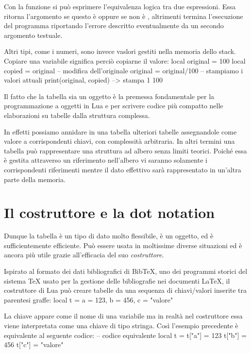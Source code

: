 Con la funzione  si può esprimere l'equivalenza logica tra due
espressioni. Essa ritorna l'argomento se questo è  oppure se non è
, altrimenti termina l'esecuzione del programma riportando l'errore
descritto eventualmente da un secondo argomento testuale.

Altri tipi, come i numeri, sono invece vaslori gestiti nella memoria dello
stack. Copiare una variabile significa perciò copiarne il valore:
\lines
local original = 100
local copied = original
-- modifica dell'originale
original = original/100
-- stampiamo i valori attuali
print(original, copied) --> stampa 1  100
\endlines
{}

Il fatto che la tabella sia un oggetto è la premessa fondamentale per la
programmazione a oggetti in Lua e per scrivere codice più compatto nelle
elaborazioni su tabelle dalla struttura complessa.

In effetti possiamo annidare in una tabella ulteriori tabelle assegnandole come
valore a corrispondenti chiavi, con complessità arbitraria. In altri termini una
tabella può rappresentare una struttura ad albero senza limiti teorici. Poiché
essa è gestita attraverso un riferimento nell'albero vi saranno solamente i
corrispondenti riferimenti mentre il dato effettivo sarà rappresentato in
un'altra parte della memoria.


\section{Il costruttore e la dot notation}

Dunque la tabella è un tipo di dato molto flessibile, è un oggetto, ed è
sufficientemente efficiente. Può essere usata in moltissime diverse situazioni
ed è ancora più utile grazie all'efficacia del suo \emph{costruttore}.

Ispirato al formato dei dati bibliografici di BibTeX, uno dei programmi storici
del sistema \TeX{} usato per la gestione delle bibliografie nei documenti
\LaTeX, il costruttore di Lua può creare tabelle da una sequenza di
chiavi/valori inserite tra parentesi graffe:
\lines
local t = { a = 123, b = 456, c = "valore" }
\endlines
{}

La chiave appare come il nome di una variabile ma in realtà nel costruttore
essa viene interpretata come una chiave di tipo stringa. Così l'esempio
precedente è equivalente al seguente codice:
\lines
-- codice equivalente
local t = {}
t["a"] = 123
t["b"] = 456
t["c"] = "valore"
\endlines
{}

